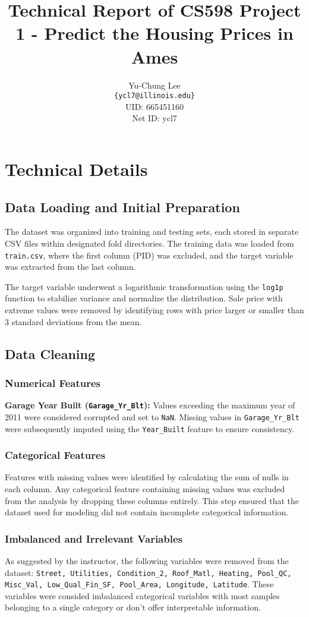 \documentclass[11pt,a4paper]{article}
\title{Technical Report of CS598 Project 1 - Predict the Housing Prices in Ames}
\author{Yu-Chung Lee \\
  \texttt{\{ycl7@illinois.edu\}} \\
  UID: 665451160 \\
  Net ID: ycl7 \\
  }
\begin{document}
\maketitle

\section{Technical Details}

\subsection{Data Loading and Initial Preparation}
The dataset was organized into training and testing sets, each stored in
separate CSV files within designated fold directories. The training data was
loaded from \texttt{train.csv}, where the first column (PID) was excluded, and
the target variable was extracted from the last column.

The target variable underwent a logarithmic transformation using the
\texttt{log1p} function to stabilize variance and normalize the distribution.
Sale price with extreme values were removed by identifying rows with price
larger or smaller than 3 standard deviations from the mean.

\subsection{Data Cleaning}
\subsubsection{Numerical Features}
\textbf{Garage Year Built (\texttt{Garage\_Yr\_Blt}):} Values exceeding the maximum year of 2011 were considered corrupted and set to \texttt{NaN}. Missing values in \texttt{Garage\_Yr\_Blt} were subsequently imputed using the \texttt{Year\_Built} feature to ensure consistency.

\subsubsection{Categorical Features}
Features with missing values were identified by calculating the sum of nulls in
each column. Any categorical feature containing missing values was excluded
from the analysis by dropping these columns entirely. This step ensured that
the dataset used for modeling did not contain incomplete categorical
information.

\subsubsection{Imbalanced and Irrelevant Variables}
As suggested by the instructor, the following variables were removed from the
dataset: \texttt{Street, Utilities, Condition\_2, Roof\_Matl, Heating,
  Pool\_QC, Misc\_Val, Low\_Qual\_Fin\_SF, Pool\_Area, Longitude, Latitude}.
These variables were consided imbalanced categorical variables with most
samples belonging to a single category or don't offer interpretable
information.
\end{document}
